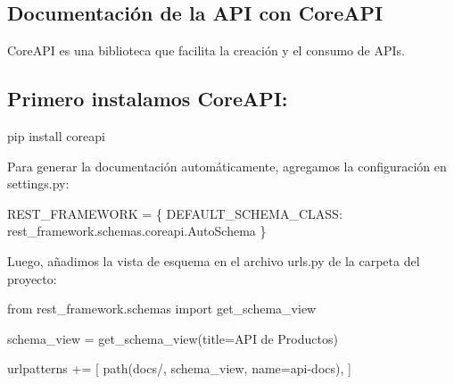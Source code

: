 \documentclass[
  a4paper,
  DIV=11,
  numbers=noendperiod,
  onepage,
  openany]{scrreprt}
\newenvironment{Shaded}{\begin{snugshade}}{\end{snugshade}}
\newcommand{\ExtensionTok}[1]{\textcolor[rgb]{0.00,0.23,0.31}{#1}}
\newcommand{\ImportTok}[1]{\textcolor[rgb]{0.00,0.46,0.62}{#1}}
\newcommand{\NormalTok}[1]{\textcolor[rgb]{0.00,0.23,0.31}{#1}}
\newcommand{\OperatorTok}[1]{\textcolor[rgb]{0.37,0.37,0.37}{#1}}
\newcommand{\StringTok}[1]{\textcolor[rgb]{0.13,0.47,0.30}{#1}}
\begin{document}
\begin{tcolorbox}
\chapter{Documentación de la API con
CoreAPI}\label{documentaciuxf3n-de-la-api-con-coreapi}

CoreAPI es una biblioteca que facilita la creación y el consumo de APIs.

\section{Primero instalamos CoreAPI:}\label{primero-instalamos-coreapi}

\begin{Shaded}
\begin{Highlighting}[]
\ExtensionTok{pip}\NormalTok{ install coreapi}
\end{Highlighting}
\end{Shaded}

Para generar la documentación automáticamente, agregamos la
configuración en settings.py:

\begin{Shaded}
\begin{Highlighting}[]
\NormalTok{REST\_FRAMEWORK }\OperatorTok{=}\NormalTok{ \{}
    \StringTok{\textquotesingle{}DEFAULT\_SCHEMA\_CLASS\textquotesingle{}}\NormalTok{: }\StringTok{\textquotesingle{}rest\_framework.schemas.coreapi.AutoSchema\textquotesingle{}}
\NormalTok{\}}
\end{Highlighting}
\end{Shaded}

Luego, añadimos la vista de esquema en el archivo urls.py de la carpeta
del proyecto:

\begin{Shaded}
\begin{Highlighting}[]
\ImportTok{from}\NormalTok{ rest\_framework.schemas }\ImportTok{import}\NormalTok{ get\_schema\_view}

\NormalTok{schema\_view }\OperatorTok{=}\NormalTok{ get\_schema\_view(title}\OperatorTok{=}\StringTok{\textquotesingle{}API de Productos\textquotesingle{}}\NormalTok{)}

\NormalTok{urlpatterns }\OperatorTok{+=}\NormalTok{ [}
\NormalTok{    path(}\StringTok{\textquotesingle{}docs/\textquotesingle{}}\NormalTok{, schema\_view, name}\OperatorTok{=}\StringTok{\textquotesingle{}api{-}docs\textquotesingle{}}\NormalTok{),}
\NormalTok{]}
\end{Highlighting}
\end{Shaded}


\end{tcolorbox}
\end{document}

